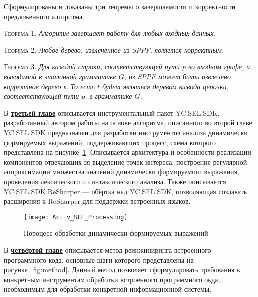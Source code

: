 \vspace{10pt}

Сформулированы и доказаны три теоремы о завершаемости и корректности предложенного алгоритма.

\vspace{5pt}

\textsc{Теорема 1.} 
\textit{Алгоритм завершает работу для любых входных данных.}

\vspace{10pt}

\textsc{Теорема 2.} 
\textit{Любое дерево, извлечённое из SPPF, является корректным.}

\vspace{10pt}

\textsc{Теорема 3.} 
\textit{Для каждой строки, соответствующей пути $p$ во входном графе, и выводимой в эталонной грамматике $G$, из SPPF может быть извлечено корректное дерево $t$. То есть $t$ будет являться деревом вывода цепочки, соответствующей пути $p$, в грамматике $G$.}

\vspace{10pt}

В \underline{\textbf{третьей главе}}  описывается инструментальный пакет YC.SEL.SDK, разработанный автором работы на основе алгоритма, описанного во второй главе. YC.SEL.SDK предназначен для разработки 
инструментов анализа динамически формируемых выражений, поддерживающих процесс, схема которого представлена на рисунке~\ref{sel_processing}. Описывается архитектура и особенности реализации компонентов отвечающих зя выделение точек интереса, 
 построение регулярной аппроксимации множества значений динамически формируемого выражения, проведения лексического и синтаксического анализа. Также описывается YC.SEL.SDK.ReSharper --- обёртка над YC.SEL.SDK, позволяющая создавать расширения к ReSharper для поддержки встроенных языков.

\begin{figure}[H]
  \centering
 \texttt{[image: Activ\_SEL\_Processing]}
 \caption{Пороцесс обработки динамически формируемых выражений}
 \label{sel_processing}
\end{figure}


В \underline{\textbf{четвёртой главе}} описывается метод реинжиниринга встроенного программного кода, основные шаги которого представлены на рисунке~\ref{fig:method}. Данный метод позволяет сформулировать требования к конкретным инструментам обработки встроенного программного окда, необходимым для обработки конкретной информационной системы.

